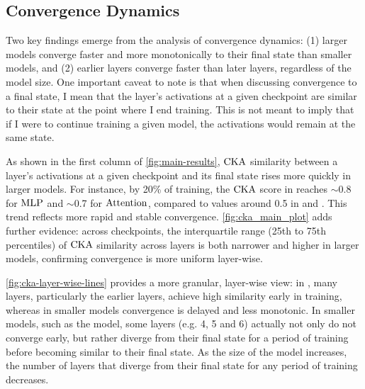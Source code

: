 \subsection{Convergence Dynamics}
\label{subsec:convergence-dynamics}

Two key findings emerge from the analysis of convergence dynamics: (1) larger models converge faster and more monotonically to their final state than smaller models, and (2) earlier layers converge faster than later layers, regardless of the model size. One important caveat to note is that when discussing convergence to a final state, I mean that the layer's activations at a given checkpoint are similar to their state at the point where I end training. This is not meant to imply that if I were to continue training a given model, the activations would remain at the same state. 

\begin{result} 
\label{result:cka}
    
As shown in the first column of \cref{fig:main-results}, $\mathrm{CKA}$ similarity between a layer's activations at a given checkpoint and its final state rises more quickly in larger models. For instance, by 20\% of training, the $\mathrm{CKA}$ score in \twobil reaches $\sim$0.8 for $\mathrm{MLP}$ and $\sim$0.7 for $\mathrm{Attention}$, compared to values around 0.5 in \sevenmil and \sixmil. This trend reflects more rapid and stable convergence. \cref{fig:cka_main_plot} adds further evidence: across checkpoints, the interquartile range (25th to 75th percentiles) of $\mathrm{CKA}$ similarity across layers is both narrower and higher in larger models, confirming convergence is more uniform layer-wise.

\cref{fig:cka-layer-wise-lines} provides a more granular, layer-wise view: in \twobil, many layers, particularly the earlier layers, achieve high similarity early in training, whereas in smaller models convergence is delayed and less monotonic. In smaller models, such as the \sevenmil model, some layers (e.g. 4, 5 and 6) actually not only do not converge early, but rather diverge from their final state for a period of training before becoming similar to their final state. As the size of the model increases, the number of layers that diverge from their final state for any period of training decreases.

\end{result}

